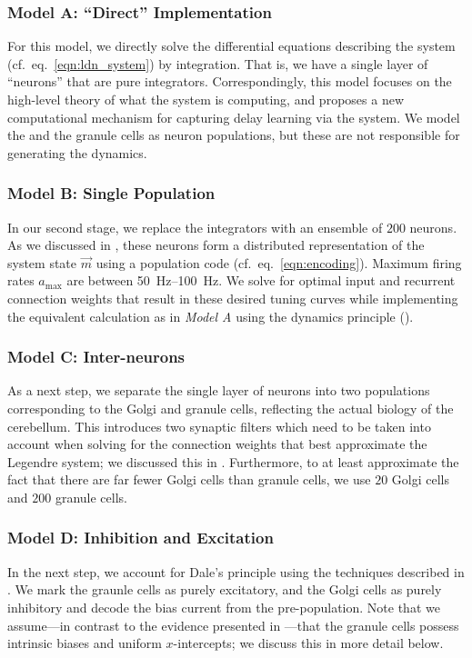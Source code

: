 \subsubsection{Model A: \enquote{Direct} Implementation} 
For this model, we directly solve the differential equations describing the \LDN system (cf.~eq.~\ref{eqn:ldn_system}) by integration.
That is, we have a single layer of \enquote{neurons} that are pure integrators.
Correspondingly, this model focuses on the high-level theory of what the system is computing, and proposes a new computational mechanism for capturing delay learning via the \LDN system.
We model the \PCN and the granule cells as neuron populations, but these are not responsible for generating the dynamics.

\subsubsection{Model B: Single Population}
In our second stage, we replace the integrators with an ensemble of $200$ \LIF neurons.
As we discussed in , these neurons form a distributed representation of the \LDN system state $\vec{m}$ using a population code (cf.~eq.~\ref{eqn:encoding}).
Maximum firing rates $a_\mathrm{max}$ are between \SIrange{50}{100}{\hertz}.
We solve for optimal input and recurrent connection weights that result in these desired tuning curves while implementing the equivalent calculation as in \emph{Model A} using the \NEF dynamics principle ().

\subsubsection{Model C: Inter-neurons}
As a next step, we separate the single layer of neurons into two populations corresponding to the Golgi and granule cells, reflecting the actual biology of the cerebellum.
This introduces two synaptic filters which need to be taken into account when solving for the connection weights that best approximate the Legendre system; we discussed this in .
Furthermore, to at least approximate the fact that there are far fewer Golgi cells than granule cells, we use $20$ Golgi cells and $200$ granule cells.

\subsubsection{Model D: Inhibition and Excitation}
In the next step, we account for Dale's principle using the techniques described in .
We mark the graunle cells as purely excitatory, and the Golgi cells as purely inhibitory and decode the bias current from the pre-population.
Note that we assume---in contrast to the evidence presented in ---that the granule cells possess intrinsic biases and uniform $x$-intercepts; we discuss this in more detail below.

